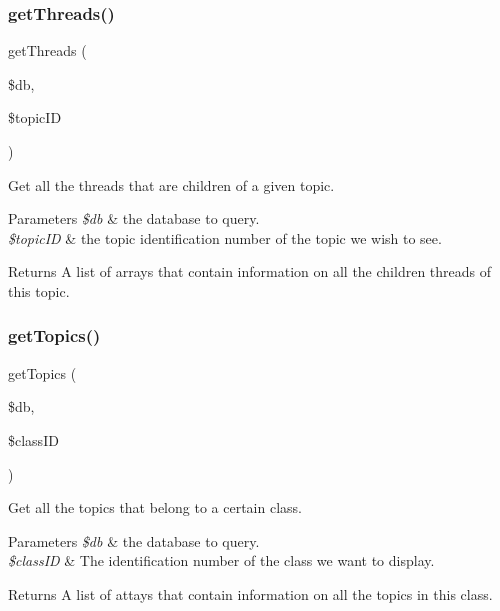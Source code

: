 \subsubsection{\texorpdfstring{get\+Threads()}{getThreads()}}
{\footnotesize\ttfamily get\+Threads (\begin{DoxyParamCaption}\item[{}]{\$db,  }\item[{}]{\$topic\+ID }\end{DoxyParamCaption})}



Get all the threads that are children of a given topic. 


\begin{DoxyParams}{Parameters}
{\em \$db} & the database to query. \\
\hline
{\em \$topic\+ID} & the topic identification number of the topic we wish to see. \\
\hline
\end{DoxyParams}
\begin{DoxyReturn}{Returns}
A list of arrays that contain information on all the children threads of this topic. 
\end{DoxyReturn}
\mbox{\label{database_8php_ad32b3315782f9584aa725a4d5f8bbd3b}} 
\subsubsection{\texorpdfstring{get\+Topics()}{getTopics()}}
{\footnotesize\ttfamily get\+Topics (\begin{DoxyParamCaption}\item[{}]{\$db,  }\item[{}]{\$class\+ID }\end{DoxyParamCaption})}



Get all the topics that belong to a certain class. 


\begin{DoxyParams}{Parameters}
{\em \$db} & the database to query. \\
\hline
{\em \$class\+ID} & The identification number of the class we want to display. \\
\hline
\end{DoxyParams}
\begin{DoxyReturn}{Returns}
A list of attays that contain information on all the topics in this class. 
\end{DoxyReturn}
\mbox{\label{database_8php_aa138e957fd5d5f52a5e0a54ae78b74b9}} 
